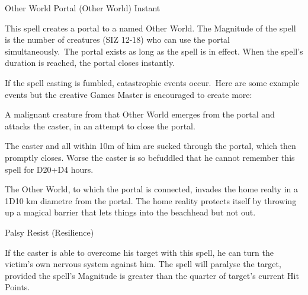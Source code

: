 \begin{samepage}
\begin{rpg-spell}
{Other World Portal (Other World)}
{Instant}

This spell creates a portal to a named Other World. The Magnitude of the spell is the number of creatures (SIZ 12-18) who can use the portal simultaneously. The portal exists as long as the spell is in effect. When the spell’s duration is reached, the portal closes instantly. 

If the spell casting is fumbled, catastrophic events occur. Here are some example events but the creative Games Master is encouraged to create more:
\begin{rpg-list}
\item A malignant creature from that Other World emerges from the portal and attacks the caster, in an attempt to close the portal. 
\item The caster and all within 10m of him are sucked through the portal, which then promptly closes. Worse the caster is so befuddled that he cannot remember this spell for D20+D4 hours.
\item The Other World, to which the portal is connected, invades the home realty in a 1D10 km diametre from the portal. The home reality protects itself by throwing up a magical barrier that lets things into the beachhead but not out. 
\end{rpg-list}
\end{rpg-spell}
\end{samepage}


\begin{samepage}
\begin{rpg-spell}
{Palsy}
{Resist (Resilience)}

If the caster is able to overcome his target with this spell, he can turn the victim’s own nervous system against him. The spell will paralyse the target, provided the spell’s Magnitude is greater than the quarter of target’s current Hit Points. 
\end{rpg-spell}
\end{samepage}


